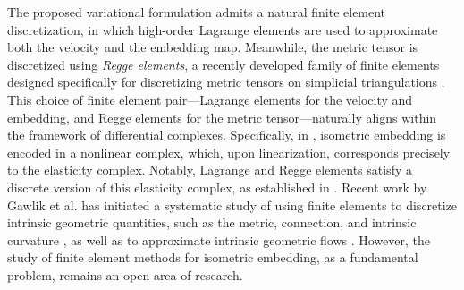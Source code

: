 \documentclass[11pt,a4paper,oneside,reqno]{amsart}
\theoremstyle{definition}
\theoremstyle{plain}
\numberwithin{theorem}{section}
\numberwithin{proposition}{section}
\numberwithin{lemma}{section}
\numberwithin{equation}{section}
\begin{document}
The proposed variational formulation admits a natural finite element discretization, in which high-order Lagrange elements are used to approximate both the velocity and the embedding map. Meanwhile, the metric tensor is discretized using \emph{Regge elements}, a recently developed family of finite elements designed specifically for discretizing metric tensors on simplicial triangulations \cite{regge1961general,christiansen2004characterization, li2018regge}.
This choice of finite element pair—Lagrange elements for the velocity and embedding, and Regge elements for the metric tensor—naturally aligns within the framework of differential complexes. Specifically, in \cite{hu2022nonlinear}, isometric embedding is encoded in a nonlinear complex, which, upon linearization, corresponds precisely to the elasticity complex. Notably, Lagrange and Regge elements satisfy a discrete version of this elasticity complex, as established in \cite{christiansen2011linearization}.
Recent work by Gawlik et al. has initiated a systematic study of using finite elements to discretize intrinsic geometric quantities, such as the metric, connection, and intrinsic curvature \cite{berchenko2024finite, gawlik2020high, gopalakrishnan2023analysis, gopalakrishnan2023generalizing}, as well as to approximate intrinsic geometric flows \cite{gao2025ricci, gawlik2019finite}. However, the study of finite element methods for isometric embedding, as a fundamental problem, remains an open area of research. 
\end{document}
